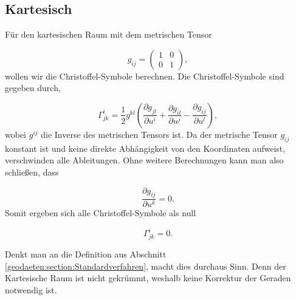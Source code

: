%
%
%
%
\subsection{Kartesisch\label{geodaeten:section:Standardverfahren:Kartesisch}}

Für den kartesischen Raum mit dem metrischen Tensor
 
\begin{equation}
g_{ij} = \begin{pmatrix} 
	1 & 0 \\ 
	0 & 1 
\end{pmatrix},
\end{equation}
wollen wir die Christoffel-Symbole berechnen.
Die Christoffel-Symbole sind gegeben durch,

\begin{equation}
\Gamma^i_{jk} = \frac{1}{2} g^{kl} \left( \frac{\partial g_{jl}}{\partial u^i} + \frac{\partial g_{il}}{\partial u^j} - \frac{\partial g_{ij}}{\partial u^l} \right),
\end{equation}
wobei $g^{ij}$ die Inverse des metrischen Tensors ist.
Da der metrische Tensor $g_{ij}$ konstant ist und keine direkte Abhängigkeit von den Koordinaten aufweist, verschwinden alle Ableitungen.
Ohne weitere Berechnungen kann man also schließen, dass

\begin{equation}
\frac{\partial g_{ij}}{\partial u^k} = 0 .
\end{equation}
Somit ergeben sich alle Christoffel-Symbole als null

\begin{equation}
\Gamma^i_{jk} = 0 .
\end{equation}

Denkt man an die Definition aus Abschnitt \ref{geodaeten:section:Standardverfahren}, macht dies durchaus Sinn.
Denn der Kartesische Raum ist nicht gekrümmt, weshalb keine Korrektur der Geraden notwendig ist.

